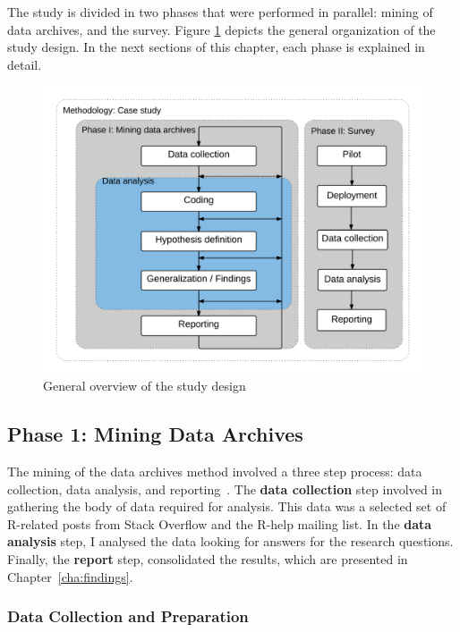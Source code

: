 \documentclass{sig-alternate-05-2015}
\begin{document}
	The study is divided in two phases that were performed in parallel: mining of data archives, and the survey.
	Figure \ref{fig:StudyPhases} depicts the general organization of the study design.
	In the next sections of this chapter, each phase is explained in detail.

	\begin{figure} [!ht]
		\centering
		\includegraphics[width=0.9\columnwidth]{Figures/StudyPhases}
		\caption{General overview of the study design}
		\label{fig:StudyPhases}
	\end{figure}

\subsection{Phase 1: Mining Data Archives} 
\label{sec:studyDesign}

	The mining of the data archives method involved a three step process: data collection, data analysis, and reporting~\cite{Runeson2012}.
	The \textbf{data collection} step involved in gathering the body of data required for analysis. 
	This data was a selected set of R-related posts from Stack Overflow and the R-help mailing list.
	In the \textbf{data analysis} step, I analysed the data looking for answers for the research questions.
	Finally, the \textbf{report} step, consolidated the results, which are presented in Chapter~\ref{cha:findings}.

\subsubsection{Data Collection and Preparation}
\label{subsec:preparation}
\end{document}
